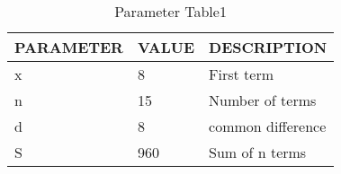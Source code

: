 \begin{table}[ht]
    \def\arraystretch{1.5}
    \centering
    \begin{tabular}{|p{2.3cm}|p{2.3cm}|p{2.3cm}|}
    \hline
    PARAMETER & VALUE & DESCRIPTION \\ \hline
    x\brak0 & 8 & First term \\ \hline
    n & 15 & Number of terms \\ \hline
    d & 8 & common difference \\ \hline
    S &960 & Sum of n terms \\ \hline
    \end{tabular}
    \caption{Parameter Table1}
    \label{tab:10.5.3.1}
\end{table}
